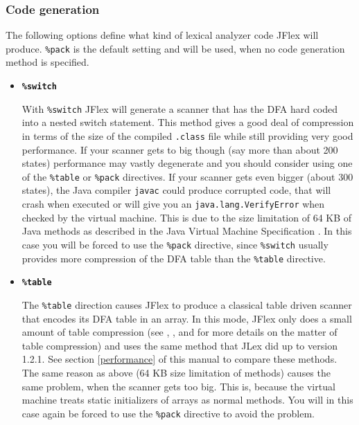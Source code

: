 \documentclass[11pt]{scrartcl}
\begin{document}
\subsubsection{Code generation\label{CodeGeneration}}
The following options define what kind of lexical analyzer code JFlex
will produce. \texttt{\%pack} is the default setting and will be used,
when no code generation method is specified.
 
\begin{itemize}
\item 
  {\bf \tt \%switch}

  With \texttt{\%switch} JFlex will generate a scanner that has
  the DFA hard coded into a nested switch statement. This method gives
  a good deal of compression in terms of the size of the compiled 
  \texttt{.class} file while still providing very good performance. If your
  scanner gets to big though (say more than about 200 states)
  performance may vastly degenerate and you should consider using one
  of the \texttt{\%table} or \texttt{\%pack} directives. If your scanner
  gets even bigger (about 300 states), the Java compiler \texttt{javac}
  could produce corrupted code, that will crash when executed or will
  give you an \texttt{java.lang.VerifyError} when checked by the virtual
  machine. This is due to the size limitation of 64 KB of Java
  methods as described in the Java Virtual Machine Specification
  \cite{MachineSpec}. In this case you will be forced to use the 
  \texttt{\%pack} directive, since \texttt{\%switch}
  usually provides more compression of the DFA table than the 
  \texttt{\%table} directive.

 
\item
  {\bf \texttt{\%table}}
  
  The \texttt{\%table} direction causes JFlex to produce a classical
  table driven scanner that encodes its DFA table in an array.  In
  this mode, JFlex only does a small amount of table compression (see
  \cite{ParseTable}, \cite{SparseTable}, \cite{Aho} and \cite{Maurer}
  for more details on the matter of table compression) and uses the
  same method that JLex did up to version 1.2.1. See section \ref{performance}
   of this manual to compare
  these methods. The same reason as above (64 KB size limitation of
  methods) causes the same problem, when the scanner gets too big.
  This is, because the virtual machine treats static initializers of
  arrays as normal methods. You will in this case again be forced to
  use the \texttt{\%pack} directive to avoid the problem.
 

\end{itemize}
\end{document}

